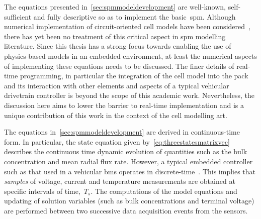
The  equations   presented  in~\cref{sec:spmmodeldevelopment}   are  well-known,
self-sufficient and  fully descriptive so  as to implement  the basic~\gls{spm}.
Although  numerical implementation  of  circuit-oriented cell  models have  been
considered~\cite{Plett2004,Plett2004a,Plett2004b,Plett2006}, there  has yet been
no treatment  of this critical  aspect in \gls{spm} modelling  literature. Since
this thesis has a strong focus  towards enabling the use of physics-based models
in an embedded environment, at least the numerical aspects of implementing these
equations needs to be discussed. The  finer details of real-time programming, in
particular the integration  of the cell model into the  pack and its interaction
with other elements and aspects of  a typical vehicular drivetrain controller is
beyond the scope  of this academic work. Nevertheless, the  discussion here aims
to lower the barrier to real-time implementation and is a unique contribution of
this work in the context of the cell modelling art.


The equations  in~\cref{sec:spmmodeldevelopment} are derived  in continuous-time
form. In particular, the  state equation given by~\cref{eq:threestatesmatrixvec}
describes  the  continuous   time  dynamic  evolution  of   quantities  such  as
the  bulk  concentration   and  mean  radial  flux  rate.   However,  a  typical
embedded  controller such  as that  used in  a vehicular  \gls{bms} operates  in
discrete-time~\cite{Andrea2010}.  This implies  that \emph{samples}  of voltage,
current  and temperature  measurements  are obtained  at  specific intervals  of
time,~$T_s$. The  computations of the  model equations and updating  of solution
variables  (such as  bulk  concentrations and  terminal  voltage) are  performed
between two successive data acquisition events from the sensors.



